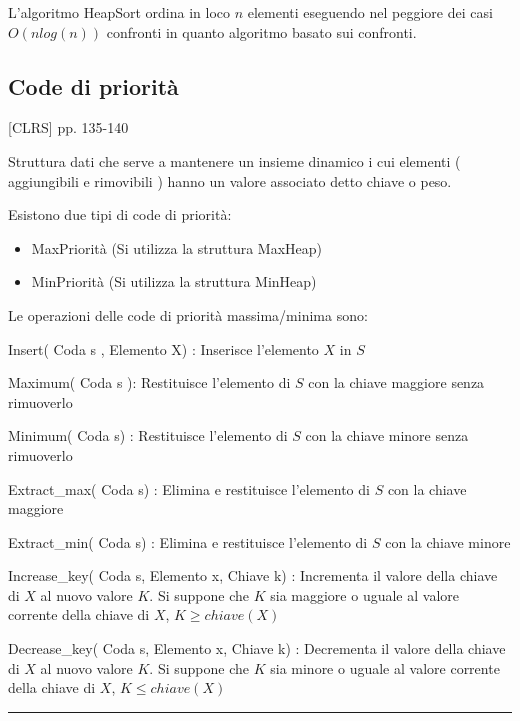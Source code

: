 \documentclass{article}
\providecommand{\tightlist}{%
  \setlength{\itemsep}{0pt}\setlength{\parskip}{0pt}}
\begin{document}
{{{L'algoritmo HeapSort ordina in loco $n$ elementi eseguendo nel peggiore dei casi $O(nlog(n))$ confronti in quanto algoritmo basato sui confronti.}

\hypertarget{h.jih9riph7gns}{\subsection{\texorpdfstring{{Code di
priorità}}{Code di priorità}}\label{h.jih9riph7gns}}

{{[}CLRS{]} pp. 135-140}

{Struttura dati che serve a mantenere un insieme dinamico i cui elementi ( aggiungibili e rimovibili ) hanno un valore associato detto chiave o peso.}

{Esistono due tipi di code di priorità:}

\begin{itemize}
\tightlist
\item
  {MaxPriorità (Si utilizza la struttura MaxHeap)}
\item
  {MinPriorità (Si utilizza la struttura MinHeap)}
\end{itemize}

{Le operazioni delle code di priorità massima/minima sono:}

{Insert( Coda s , Elemento X) : Inserisce l'elemento $X$ in $S$}

{Maximum( Coda s ): Restituisce l'elemento di $S$ con la chiave maggiore senza rimuoverlo}

{Minimum( Coda s) : Restituisce l'elemento di $S$ con la chiave minore senza rimuoverlo}

{Extract\_max( Coda s) : Elimina e restituisce l'elemento di $S$ con la chiave maggiore}

{Extract\_min( Coda s) : Elimina e restituisce l'elemento di $S$ con la chiave minore}

{Increase\_key( Coda s, Elemento x, Chiave k) : Incrementa il valore della chiave di $X$ al nuovo valore $K$. Si suppone che $K$ sia maggiore o uguale al valore corrente della chiave di $X$, $K \geq chiave(X)$}

{Decrease\_key( Coda s, Elemento x, Chiave k) : Decrementa il valore della chiave di $X$ al nuovo valore $K$. Si suppone che $K$ sia minore o uguale al valore corrente della chiave di $X$, $K \leq chiave(X)$}

\begin{center}\rule{0.5\linewidth}{\linethickness}\end{center}

}}
\end{document}

